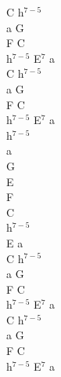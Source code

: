 \documentclass[a5paper, 10pt]{book}
\begin{document}
\begin{minipage}[t]{0.2\textwidth}
C h$^{7-5}$\\
a G\\
F C\\
h$^{7-5}$ E$^7$ a\\
C h$^{7-5}$\\
a G\\
F C\\
h$^{7-5}$ E$^7$ a\\

h$^{7-5}$\\
a\\
G\\
E\\
F\\
C\\
h$^{7-5}$\\
E a\\

C h$^{7-5}$\\
a G\\
F C\\
h$^{7-5}$ E$^7$ a\\
C h$^{7-5}$\\
a G\\
F C\\
h$^{7-5}$ E$^7$ a\\

\end{minipage}


\newpage
\end{document}
